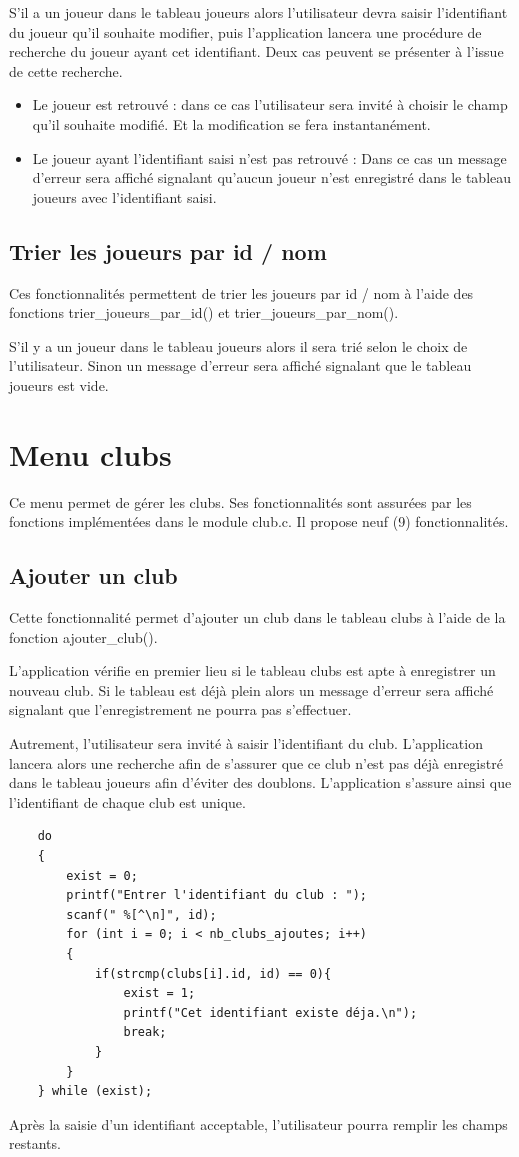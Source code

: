 \documentclass[12pt,a4paper]{report}
\begin{document}
S'il a un joueur dans le tableau joueurs alors l'utilisateur devra saisir l'identifiant du joueur qu'il souhaite modifier, puis l'application lancera une procédure de recherche du joueur ayant cet identifiant. Deux cas peuvent se présenter à l'issue de cette recherche.
\begin{itemize}
	\item Le joueur est retrouvé : dans ce cas l'utilisateur sera invité à choisir le champ qu'il souhaite modifié. Et la modification se fera instantanément.
	\item Le joueur ayant l'identifiant saisi n'est pas retrouvé : Dans ce cas un message d'erreur sera affiché signalant qu'aucun joueur n'est enregistré dans le tableau joueurs avec l'identifiant saisi.
\end{itemize}

\subsection{Trier les joueurs par id / nom}
Ces fonctionnalités permettent de trier les joueurs par id / nom à l'aide des fonctions trier\_joueurs\_par\_id() et trier\_joueurs\_par\_nom().

S'il y a un joueur dans le tableau joueurs alors il sera trié selon le choix de l'utilisateur. Sinon un message d'erreur sera affiché signalant que le tableau joueurs est vide. 

\section{Menu clubs}
Ce menu permet de gérer les clubs. Ses fonctionnalités sont assurées par les fonctions implémentées dans le module club.c. Il propose neuf (9) fonctionnalités.

\subsection{Ajouter un club}
Cette fonctionnalité permet d'ajouter un club dans le tableau clubs à l'aide de la fonction ajouter\_club().

L'application vérifie en premier lieu si le tableau clubs est apte à enregistrer un nouveau club. Si le tableau est déjà plein alors un message d'erreur sera affiché signalant que l'enregistrement ne pourra pas s'effectuer.

Autrement, l'utilisateur sera invité à saisir l'identifiant du club. L'application lancera alors une recherche afin de s'assurer que ce club n'est pas déjà enregistré dans le tableau joueurs afin d'éviter des doublons. L'application s'assure ainsi que l'identifiant de chaque club est unique. 
\begin{lstlisting}
	do
	{   
		exist = 0;
		printf("Entrer l'identifiant du club : ");
		scanf(" %[^\n]", id);
		for (int i = 0; i < nb_clubs_ajoutes; i++)
		{
			if(strcmp(clubs[i].id, id) == 0){
				exist = 1;
				printf("Cet identifiant existe déja.\n");
				break;
			}
		}               
	} while (exist);
\end{lstlisting}	
Après la saisie d'un identifiant acceptable, l'utilisateur pourra remplir les champs restants.
\end{document}
